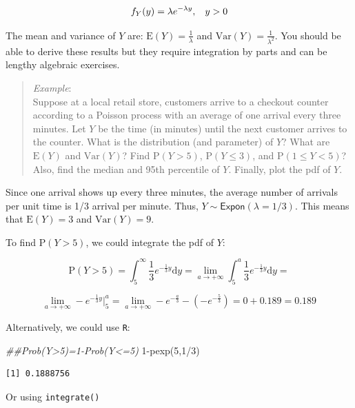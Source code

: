 \documentclass[
  letterpaper,
  DIV=11,
  numbers=noendperiod]{scrreprt}
\newenvironment{Shaded}{\begin{snugshade}}{\end{snugshade}}
\newcommand{\DecValTok}[1]{\textcolor[rgb]{0.68,0.00,0.00}{#1}}
\newcommand{\DocumentationTok}[1]{\textcolor[rgb]{0.37,0.37,0.37}{\textit{#1}}}
\newcommand{\FunctionTok}[1]{\textcolor[rgb]{0.28,0.35,0.67}{#1}}
\newcommand{\NormalTok}[1]{\textcolor[rgb]{0.00,0.23,0.31}{#1}}
\newcommand{\SpecialCharTok}[1]{\textcolor[rgb]{0.37,0.37,0.37}{#1}}
\begin{document}
\[
f_Y(y)=\lambda e^{-\lambda y}, \hspace{0.3cm} y>0
\]

The mean and variance of \(Y\) are: \(\mbox{E}(Y)=\frac{1}{\lambda}\)
and \(\mbox{Var}(Y)=\frac{1}{\lambda^2}\). You should be able to derive
these results but they require integration by parts and can be lengthy
algebraic exercises.

\begin{quote}
\emph{Example}:\\
Suppose at a local retail store, customers arrive to a checkout counter
according to a Poisson process with an average of one arrival every
three minutes. Let \(Y\) be the time (in minutes) until the next
customer arrives to the counter. What is the distribution (and
parameter) of \(Y\)? What are \(\mbox{E}(Y)\) and \(\mbox{Var}(Y)\)?
Find \(\mbox{P}(Y>5)\), \(\mbox{P}(Y\leq 3)\), and
\(\mbox{P}(1 \leq Y < 5)\)? Also, find the median and 95th percentile of
\(Y\). Finally, plot the pdf of \(Y\).
\end{quote}

Since one arrival shows up every three minutes, the average number of
arrivals per unit time is 1/3 arrival per minute. Thus,
\(Y\sim \textsf{Expon}(\lambda=1/3)\). This means that \(\mbox{E}(Y)=3\)
and \(\mbox{Var}(Y)=9\).

To find \(\mbox{P}(Y>5)\), we could integrate the pdf of \(Y\):

\[
\mbox{P}(Y>5)=\int_5^\infty \frac{1}{3}e^{-\frac{1}{3}y}\mbox{d} y = \lim_{a \to +\infty}\int_5^a \frac{1}{3}e^{-\frac{1}{3}y}\mbox{d} y = 
\]

\[
\lim_{a \to +\infty} -e^{-\frac{1}{3}y}\bigg|_5^a=\lim_{a \to +\infty} -e^{-\frac{a}{3}}-(-e^{-\frac{5}{3}})= 0 + 0.189 = 0.189
\]

Alternatively, we could use \texttt{R}:

\begin{Shaded}
\begin{Highlighting}[]
\DocumentationTok{\#\#Prob(Y\textgreater{}5)=1{-}Prob(Y\textless{}=5)}
\DecValTok{1}\SpecialCharTok{{-}}\FunctionTok{pexp}\NormalTok{(}\DecValTok{5}\NormalTok{,}\DecValTok{1}\SpecialCharTok{/}\DecValTok{3}\NormalTok{)}
\end{Highlighting}
\end{Shaded}

\begin{verbatim}
[1] 0.1888756
\end{verbatim}

Or using \texttt{integrate()}
\end{document}
